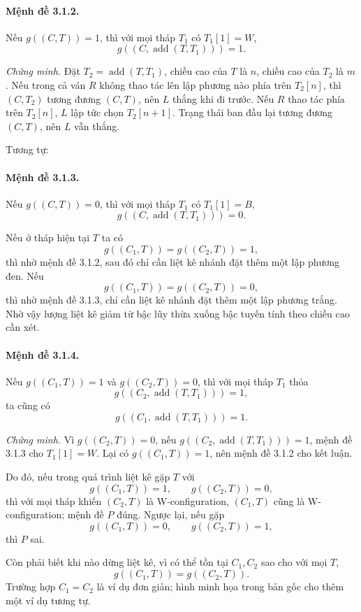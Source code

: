 \documentclass[11pt]{article}
\begin{document}
\paragraph{Mệnh đề 3.1.2.}
Nếu \(g((C,T))=1\), thì với mọi tháp \(T_1\) có \(T_1[1]=W\),
\[
  g((C,\operatorname{add}(T,T_1)))=1.
\]

\emph{Chứng minh.}
Đặt \(T_2=\operatorname{add}(T,T_1)\), chiều cao của \(T\) là \(n\), chiều cao
của \(T_2\) là \(m\). Nếu trong cả ván \(R\) không thao tác lên lập phương nào
phía trên \(T_2[n]\), thì \((C,T_2)\) tương đương \((C,T)\), nên \(L\) thắng khi
đi trước. Nếu \(R\) thao tác phía trên \(T_2[n]\), \(L\) lập tức chọn
\(T_2[n+1]\). Trạng thái ban đầu lại tương đương \((C,T)\), nên \(L\) vẫn
thắng.

Tương tự:

\paragraph{Mệnh đề 3.1.3.}
Nếu \(g((C,T))=0\), thì với mọi tháp \(T_1\) có \(T_1[1]=B\),
\[
  g((C,\operatorname{add}(T,T_1)))=0.
\]

Nếu ở tháp hiện tại \(T\) ta có
\[
  g((C_1,T))=g((C_2,T))=1,
\]
thì nhờ mệnh đề 3.1.2, sau đó chỉ cần liệt kê nhánh đặt thêm một lập phương
đen. Nếu
\[
  g((C_1,T))=g((C_2,T))=0,
\]
thì nhờ mệnh đề 3.1.3, chỉ cần liệt kê nhánh đặt thêm một lập phương trắng.
Nhờ vậy lượng liệt kê giảm từ bậc lũy thừa xuống bậc tuyến tính theo chiều cao
cần xét.

\paragraph{Mệnh đề 3.1.4.}
Nếu \(g((C_1,T))=1\) và \(g((C_2,T))=0\), thì với mọi tháp \(T_1\) thỏa
\[
  g((C_2,\operatorname{add}(T,T_1)))=1,
\]
ta cũng có
\[
  g((C_1,\operatorname{add}(T,T_1)))=1.
\]

\emph{Chứng minh.}
Vì \(g((C_2,T))=0\), nếu
\(g((C_2,\operatorname{add}(T,T_1)))=1\), mệnh đề 3.1.3 cho \(T_1[1]=W\). Lại
có \(g((C_1,T))=1\), nên mệnh đề 3.1.2 cho kết luận.

Do đó, nếu trong quá trình liệt kê gặp \(T\) với
\[
  g((C_1,T))=1,\qquad g((C_2,T))=0,
\]
thì với mọi tháp khiến \((C_2,T)\) là W-configuration, \((C_1,T)\) cũng là
W-configuration; mệnh đề \(P\) đúng. Ngược lại, nếu gặp
\[
  g((C_1,T))=0,\qquad g((C_2,T))=1,
\]
thì \(P\) sai.

Còn phải biết khi nào dừng liệt kê, vì có thể tồn tại \(C_1,C_2\) sao cho với
mọi \(T\),
\[
  g((C_1,T))=g((C_2,T)).
\]
Trường hợp \(C_1=C_2\) là ví dụ đơn giản; hình minh họa trong bản gốc cho thêm
một ví dụ tương tự.
\end{document}
